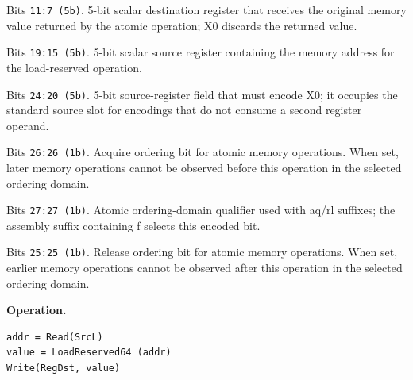 \begin{description}[leftmargin=0.18\linewidth,style=nextline]
\item[\texttt{RegDst}] Bits \texttt{11:7 (5b)}. 5-bit scalar destination register that receives the original memory value returned by the atomic operation; X0 discards the returned value.
\item[\texttt{SrcL}] Bits \texttt{19:15 (5b)}. 5-bit scalar source register containing the memory address for the load-reserved operation.
\item[\texttt{SrcZero}] Bits \texttt{24:20 (5b)}. 5-bit source-register field that must encode X0; it occupies the standard source slot for encodings that do not consume a second register operand.
\item[\texttt{aq}] Bits \texttt{26:26 (1b)}. Acquire ordering bit for atomic memory operations. When set, later memory operations cannot be observed before this operation in the selected ordering domain.
\item[\texttt{far}] Bits \texttt{27:27 (1b)}. Atomic ordering-domain qualifier used with aq/rl suffixes; the assembly suffix containing f selects this encoded bit.
\item[\texttt{rl}] Bits \texttt{25:25 (1b)}. Release ordering bit for atomic memory operations. When set, earlier memory operations cannot be observed after this operation in the selected ordering domain.
\end{description}
\noindent\textbf{Operation.}\par
\begin{lstlisting}[style=ptoscalarcode]
addr = Read(SrcL)
value = LoadReserved64 (addr)
Write(RegDst, value)
\end{lstlisting}
\Needspace{0.08\textheight}
